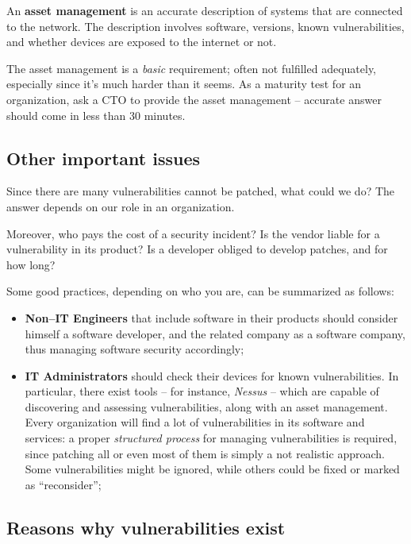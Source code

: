 \documentclass[10pt]{extbook}
\begin{document}
An \textbf{asset management} is an accurate description of systems that are
connected to the network. The description involves software, versions, known
vulnerabilities, and whether devices are exposed to the internet or not.

The asset management is a \emph{basic} requirement; often not fulfilled
adequately, especially since it's much harder than it seems. As a maturity test
for an organization, ask a CTO to provide the asset management -- accurate
answer should come in less than 30 minutes.

\subsection{Other important issues}

Since there are many vulnerabilities cannot be patched, what could we do? The
answer depends on our role in an organization.

Moreover, who pays the cost of a security incident? Is the vendor liable for a
vulnerability in its product? Is a developer obliged to develop patches, and
for how long?

Some good practices, depending on who you are, can be summarized as follows:

\begin{itemize}
    \item \textbf{Non--IT Engineers} that include software in their products
        should consider himself a software developer, and the related company
        as a software company, thus managing software security accordingly;
    \item \textbf{IT Administrators} should check their devices for known
        vulnerabilities. In particular, there exist tools -- for instance,
        \emph{Nessus} -- which are capable of discovering and assessing
        vulnerabilities, along with an asset management. Every organization
        will find a lot of vulnerabilities in its software and services: a
        proper \emph{structured process} for managing vulnerabilities is
        required, since patching all or even most of them is simply a not
        realistic approach. Some vulnerabilities might be ignored, while others
        could be fixed or marked as ``reconsider'';
\end{itemize}


\subsection{Reasons why vulnerabilities exist}
\end{document}
